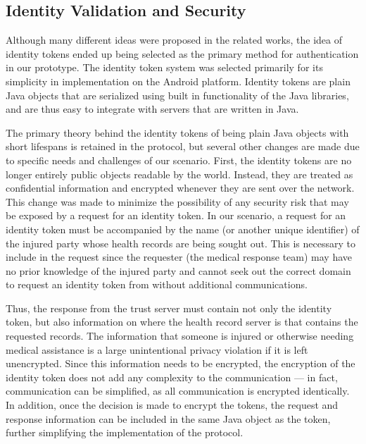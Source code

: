 \subsection{Identity Validation and Security}
Although many different ideas were proposed in the related works, the idea of identity tokens ended up being selected as the primary method for authentication in our prototype. The identity token system was selected primarily for its simplicity in implementation on the Android platform. Identity tokens are plain Java objects that are serialized using built in functionality of the Java libraries, and are thus easy to integrate with servers that are written in Java\cite{fongen1}\cite{fongen2011federated}.

The primary theory behind the identity tokens of being plain Java objects with short lifespans is retained in the protocol, but several other changes are made due to specific needs and challenges of our scenario. First, the identity tokens are no longer entirely public objects readable by the world. Instead, they are treated as confidential information and encrypted whenever they are sent over the network. This change was made to minimize the possibility of any security risk that may be exposed by a request for an identity token. In our scenario, a request for an identity token must be accompanied by the name (or another unique identifier) of the injured party whose health records are being sought out. This is necessary to include in the request since the requester (the medical response team) may have no prior knowledge of the injured party and cannot seek out the correct domain to request an identity token from without additional communications.

Thus, the response from the trust server must contain not only the identity token, but also information on where the health record server is that contains the requested records. The information that someone is injured or otherwise needing medical assistance is a large unintentional privacy violation if it is left unencrypted\cite{4451065}. Since this information needs to be encrypted, the encryption of the identity token does not add any complexity to the communication --- in fact, communication can be simplified, as all communication is encrypted identically. In addition, once the decision is made to encrypt the tokens, the request and response information can be included in the same Java object as the token, further simplifying the implementation of the protocol.


